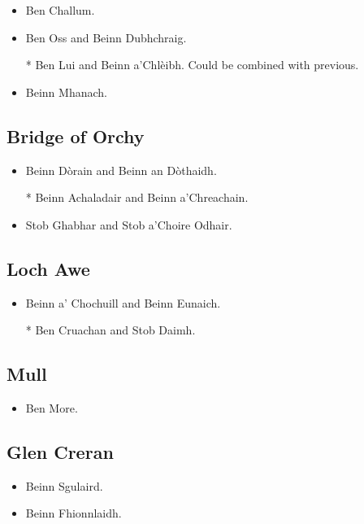 \begin{itemize}
\item Ben Challum.

\item Ben Oss and Beinn Dubhchraig.

\item[*] Ben Lui and Beinn a'Chlèibh.  Could be combined with previous. 

\item Beinn Mhanach.
\end{itemize}


\subsection{Bridge of Orchy}

\begin{itemize}
\item Beinn Dòrain and Beinn an Dòthaidh.

\item[*] Beinn Achaladair and Beinn a'Chreachain.

\item Stob Ghabhar and Stob a'Choire Odhair.

\end{itemize}


\subsection{Loch Awe}

\begin{itemize}
\item Beinn a' Chochuill and Beinn Eunaich.

\item [*] Ben Cruachan and Stob Daimh.
\end{itemize}


\subsection{Mull}

\begin{itemize}
\item Ben More.
\end{itemize}


\subsection{Glen Creran}

\begin{itemize}
\item Beinn Sgulaird.

\item Beinn Fhionnlaidh.
\end{itemize}
